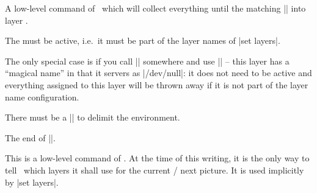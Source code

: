 \begin{command}{\pgfonlayer{}}
    A low-level command of \PGF\ which will collect everything until the matching |\endpgfonlayer| into layer .

    The  must be active, i.e.\ it must be part of the layer names of |set layers|. 
    
    The only special case is if you call || somewhere and use || -- this layer has a ``magical name'' in that it servers as |/dev/null|: it does not need to be active and everything assigned to this layer will be thrown away if it is not part of the layer name configuration.

    There must be a |\endpgfonlayer| to delimit the environment.
\end{command}
\begin{command}{\endpgfonlayer}
    The end of |\pgfonlayer|.
\end{command}


\begin{command}{\pgfsetlayers{}}
	This is a low-level command of \PGF. At the time of this writing, it is the only way to tell \PGF\ which layers it shall use for the current / next picture. It is used implicitly by |set layers|.
\end{command}
